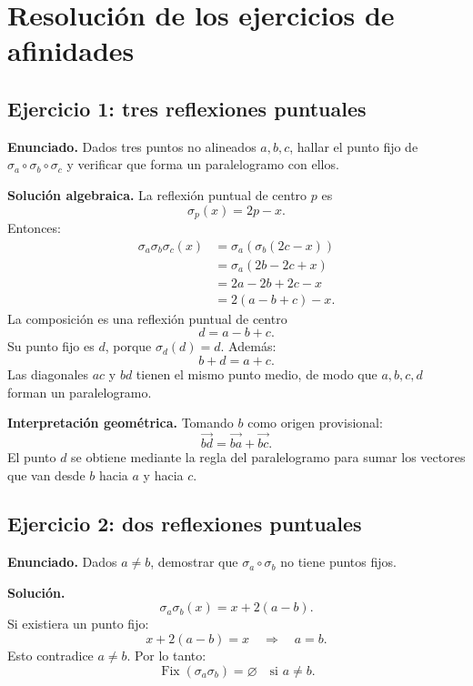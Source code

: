 \section{Resolución de los ejercicios de afinidades}\label{cap:17}\label{ap:ejercicios-afinidades}

\subsection{Ejercicio 1: tres reflexiones puntuales}

\textbf{Enunciado.} Dados tres puntos no alineados \(a,b,c\), hallar el punto fijo de
\(\sigma_a\circ\sigma_b\circ\sigma_c\) y verificar que forma un paralelogramo con ellos.

\textbf{Solución algebraica.} La reflexión puntual de centro \(p\) es
\[
  \sigma_p(x)=2p-x.
\]
Entonces:
\[
\begin{aligned}
\sigma_a\sigma_b\sigma_c(x)
&=\sigma_a\!\left(\sigma_b(2c-x)\right)\\
&=\sigma_a(2b-2c+x)\\
&=2a-2b+2c-x\\
&=2(a-b+c)-x.
\end{aligned}
\]
La composición es una reflexión puntual de centro
\[
  \boxed{d=a-b+c}.
\]
Su punto fijo es \(d\), porque \(\sigma_d(d)=d\). Además:
\[
  b+d=a+c.
\]
Las diagonales \(ac\) y \(bd\) tienen el mismo punto medio, de modo que \(a,b,c,d\) forman
un paralelogramo.

\textbf{Interpretación geométrica.} Tomando \(b\) como origen provisional:
\[
  \overrightarrow{bd}
  =\overrightarrow{ba}+\overrightarrow{bc}.
\]
El punto \(d\) se obtiene mediante la regla del paralelogramo para sumar los vectores que van
desde \(b\) hacia \(a\) y hacia \(c\).

\subsection{Ejercicio 2: dos reflexiones puntuales}

\textbf{Enunciado.} Dados \(a\neq b\), demostrar que
\(\sigma_a\circ\sigma_b\) no tiene puntos fijos.

\textbf{Solución.}
\[
\sigma_a\sigma_b(x)=x+2(a-b).
\]
Si existiera un punto fijo:
\[
x+2(a-b)=x
\quad\Longrightarrow\quad
a=b.
\]
Esto contradice \(a\neq b\). Por lo tanto:
\[
  \boxed{\operatorname{Fix}(\sigma_a\sigma_b)=\varnothing
  \quad\text{si }a\neq b.}
\]

